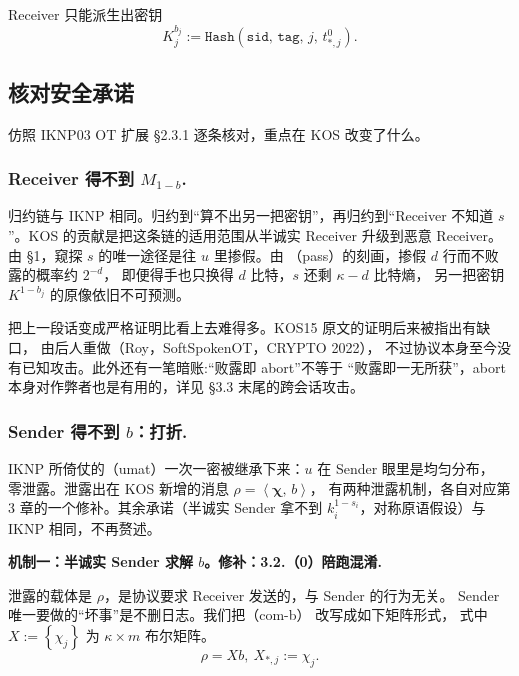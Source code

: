 Receiver 只能派生出密钥
\begin{equation}\label{eq:02-kos15:10}
K^{b_j}_j := \mathtt{Hash}\left(\mathtt{sid},\,\mathtt{tag},\,j,\,t^0_{*,j}\right).
\end{equation}

\subsection{核对安全承诺}

仿照 IKNP03 OT 扩展 §2.3.1 逐条核对，重点在 KOS 改变了什么。

\subsubsection{\texorpdfstring{Receiver 得不到 $M_{1-b}$.}{Receiver 得不到M\_\{1-b\}.}}

归约链与 IKNP 相同。归约到“算不出另一把密钥”，再归约到“Receiver
不知道 $s$”。KOS 的贡献是把这条链的适用范围从半诚实 Receiver
升级到恶意 Receiver。由 §1，窥探 $s$ 的唯一途径是往 $u$ 里掺假。由
（pass）的刻画，掺假 $d$ 行而不败露的概率约 $2^{-d}$，
即便得手也只换得 $d$ 比特，$s$ 还剩 $\kappa - d$ 比特熵，
另一把密钥 $K^{1-b_j}$ 的原像依旧不可预测。

把上一段话变成严格证明比看上去难得多。KOS15 原文的证明后来被指出有缺口，
由后人重做（Roy，SoftSpokenOT，CRYPTO 2022），
不过协议本身至今没有已知攻击。此外还有一笔暗账:“败露即 abort”不等于
“败露即一无所获”，abort 本身对作弊者也是有用的，详见 §3.3
末尾的跨会话攻击。

\subsubsection{\texorpdfstring{Sender 得不到 $b$：打折.}{Sender 得不到b：打折.}}

IKNP 所倚仗的（umat）一次一密被继承下来：$u$ 在 Sender 眼里是均匀分布，
零泄露。泄露出在 KOS
新增的消息 $\rho = \left<\boldsymbol{\chi},\, b\right>$，
有两种泄露机制，各自对应第 3 章的一个修补。其余承诺（半诚实 Sender
拿不到 $k^{1-s_i}_i$，对称原语假设）与 IKNP 相同，不再赘述。

\textbf{机制一：半诚实 Sender 求解 $b$。修补：3.2.（0）陪跑混淆.}

泄露的载体是 $\rho$，是协议要求 Receiver 发送的，与 Sender 的行为无关。
Sender 唯一要做的“坏事”是不删日志。我们把（com-b）
改写成如下矩阵形式，
式中 $X:=\left\{\chi_j\right\}$ 为 $\kappa \times m$ 布尔矩阵。
\begin{equation}\label{eq:02-kos15:11}
\rho = Xb,~ X_{*,j}:=\chi_j.
\end{equation}

